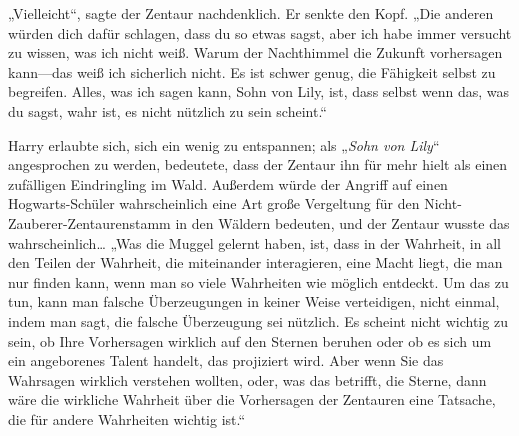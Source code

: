 „Vielleicht“, sagte der Zentaur nachdenklich. Er senkte den Kopf. „Die anderen würden dich dafür schlagen, dass du so etwas sagst, aber ich habe immer versucht zu wissen, was ich nicht weiß. Warum der Nachthimmel die Zukunft vorhersagen kann—das weiß ich sicherlich nicht. Es ist schwer genug, die Fähigkeit selbst zu begreifen. Alles, was ich sagen kann, Sohn von Lily, ist, dass selbst wenn das, was du sagst, wahr ist, es nicht nützlich zu sein scheint.“

Harry erlaubte sich, sich ein wenig zu entspannen; als „\emph{Sohn von Lily}“ angesprochen zu werden, bedeutete, dass der Zentaur ihn für mehr hielt als einen zufälligen Eindringling im Wald. Außerdem würde der Angriff auf einen Hogwarts-Schüler wahrscheinlich eine Art große Vergeltung für den Nicht-Zauberer-Zentaurenstamm in den Wäldern bedeuten, und der Zentaur wusste das wahrscheinlich…
„Was die Muggel gelernt haben, ist, dass in der Wahrheit, in all den Teilen der Wahrheit, die miteinander interagieren, eine Macht liegt, die man nur finden kann, wenn man so viele Wahrheiten wie möglich entdeckt. Um das zu tun, kann man falsche Überzeugungen in keiner Weise verteidigen, nicht einmal, indem man sagt, die falsche Überzeugung sei nützlich. Es scheint nicht wichtig zu sein, ob Ihre Vorhersagen wirklich auf den Sternen beruhen oder ob es sich um ein angeborenes Talent handelt, das projiziert wird. Aber wenn Sie das Wahrsagen wirklich verstehen wollten, oder, was das betrifft, die Sterne, dann wäre die wirkliche Wahrheit über die Vorhersagen der Zentauren eine Tatsache, die für andere Wahrheiten wichtig ist.“

